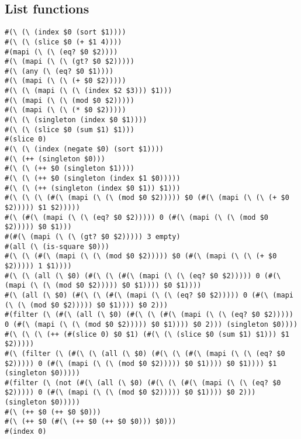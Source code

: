 \documentclass{article}
\begin{document}
\subsection{List functions}
\begin{lstlisting}[breaklines=true]
#(\ (\ (index $0 (sort $1))))
#(\ (\ (slice $0 (+ $1 4))))
#(mapi (\ (\ (eq? $0 $2))))
#(\ (mapi (\ (\ (gt? $0 $2)))))
#(\ (any (\ (eq? $0 $1))))
#(\ (mapi (\ (\ (+ $0 $2)))))
#(\ (\ (mapi (\ (\ (index $2 $3))) $1)))
#(\ (mapi (\ (\ (mod $0 $2)))))
#(\ (mapi (\ (\ (* $0 $2)))))
#(\ (\ (singleton (index $0 $1))))
#(\ (\ (slice $0 (sum $1) $1)))
#(slice 0)
#(\ (\ (index (negate $0) (sort $1))))
#(\ (++ (singleton $0)))
#(\ (\ (++ $0 (singleton $1))))
#(\ (\ (++ $0 (singleton (index $1 $0)))))
#(\ (\ (++ (singleton (index $0 $1)) $1)))
#(\ (\ (\ (#(\ (mapi (\ (\ (mod $0 $2))))) $0 (#(\ (mapi (\ (\ (+ $0 $2))))) $1 $2)))))
#(\ (#(\ (mapi (\ (\ (eq? $0 $2))))) 0 (#(\ (mapi (\ (\ (mod $0 $2))))) $0 $1)))
#(#(\ (mapi (\ (\ (gt? $0 $2))))) 3 empty)
#(all (\ (is-square $0)))
#(\ (\ (#(\ (mapi (\ (\ (mod $0 $2))))) $0 (#(\ (mapi (\ (\ (+ $0 $2))))) 1 $1))))
#(\ (\ (all (\ $0) (#(\ (\ (#(\ (mapi (\ (\ (eq? $0 $2))))) 0 (#(\ (mapi (\ (\ (mod $0 $2))))) $0 $1)))) $0 $1))))
#(\ (all (\ $0) (#(\ (\ (#(\ (mapi (\ (\ (eq? $0 $2))))) 0 (#(\ (mapi (\ (\ (mod $0 $2))))) $0 $1)))) $0 2)))
#(filter (\ (#(\ (all (\ $0) (#(\ (\ (#(\ (mapi (\ (\ (eq? $0 $2))))) 0 (#(\ (mapi (\ (\ (mod $0 $2))))) $0 $1)))) $0 2))) (singleton $0))))
#(\ (\ (\ (++ (#(slice 0) $0 $1) (#(\ (\ (slice $0 (sum $1) $1))) $1 $2)))))
#(\ (filter (\ (#(\ (\ (all (\ $0) (#(\ (\ (#(\ (mapi (\ (\ (eq? $0 $2))))) 0 (#(\ (mapi (\ (\ (mod $0 $2))))) $0 $1)))) $0 $1)))) $1 (singleton $0)))))
#(filter (\ (not (#(\ (all (\ $0) (#(\ (\ (#(\ (mapi (\ (\ (eq? $0 $2))))) 0 (#(\ (mapi (\ (\ (mod $0 $2))))) $0 $1)))) $0 2))) (singleton $0)))))
#(\ (++ $0 (++ $0 $0)))
#(\ (++ $0 (#(\ (++ $0 (++ $0 $0))) $0)))
#(index 0)
\end{lstlisting}



\end{document}
